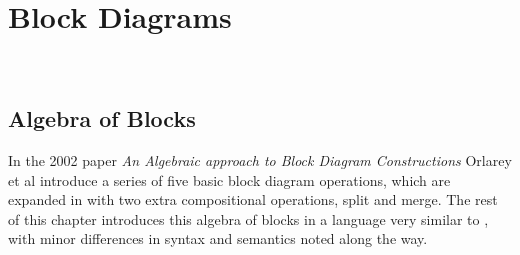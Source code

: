 \newcommand{\Ident}{\ensuremath{\textrm{ident}}\xspace}
\newcommand{\Cut}{\ensuremath{\textrm{cut}}\xspace}
\newcommand{\Sequential}{\ensuremath{\textrm{seq}}\xspace}
\newcommand{\Parallel}{\ensuremath{\textrm{par}}\xspace}
\newcommand{\Recursive}{\ensuremath{\textrm{rec}}\xspace}
\newcommand{\Resample}{\ensuremath{\textrm{resample}}\xspace}
\newcommand{\Split}{\ensuremath{\textrm{split}}\xspace}
\newcommand{\Merge}{\ensuremath{\textrm{merge}}\xspace}
\newcommand{\Ins}{\ensuremath{\textbf{ins}}\xspace}
\newcommand{\Outs}{\ensuremath{\textbf{outs}}\xspace}
\newcommand{\Sig}{\ensuremath{\mathbb{S}}\xspace}
\newcommand{\SigP}[1]{\ensuremath{\llbracket #1 \rrbracket}\xspace}


\chapter{Block Diagrams}
\label{chap:blocks}

\\

\section{Algebra of Blocks}

In the 2002 paper \emph{An Algebraic approach to Block Diagram Constructions}\autocite{orlarey2002} Orlarey et al introduce a series of five basic
block diagram operations, which are expanded in \autocite{orlarey2004} with two extra compositional
operations, split and merge. The rest of this chapter introduces this algebra of blocks in a language very
similar to \autocite{orlarey2004}, with minor differences in syntax and semantics noted along the way.


